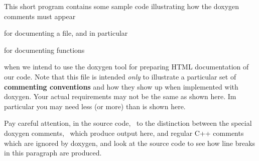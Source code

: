 This short program contains some sample code illustrating how the doxygen comments must appear
\begin{DoxyItemize}
\item for documenting a file, and in particular
\item for documenting functions
\end{DoxyItemize}when we intend to use the doxygen tool for preparing HTML documentation of our code. Note that this file is intended {\itshape only} to illustrate a particular set of {\bfseries{commenting conventions}} and how they show up when implemented with doxygen. Your actual requirements may not be the same as shown here. Im particular you may need less (or more) than is shown here.

Pay careful attention, in the source code,~\newline
 to the distinction between the special doxygen comments,~\newline
which produce output here, and regular C++ comments which are ignored by doxygen, and look at the source code to see how line breaks in this paragraph are produced. 